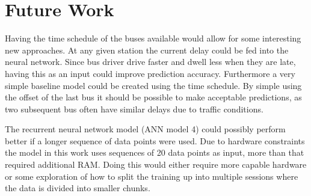 \section{Future Work}
\label{sec:future-work}
Having the time schedule of the buses available would allow for some interesting new approaches. At any given station the current delay could be fed into the neural network. Since bus driver drive faster and dwell less when they are late, having this as an input could improve prediction accuracy. Furthermore a very simple baseline model could be created using the time schedule. By simple using the offset of the last bus it should be possible to make acceptable predictions, as two subsequent bus often have similar delays due to traffic conditions.

The recurrent neural network model (ANN model 4) could possibly perform better if a longer sequence of data points were used. Due to hardware constraints the model in this work uses sequences of 20 data points as input, more than that required additional RAM. Doing this would either require more capable hardware or some exploration of how to split the training up into multiple sessions where the data is divided into smaller chunks.


